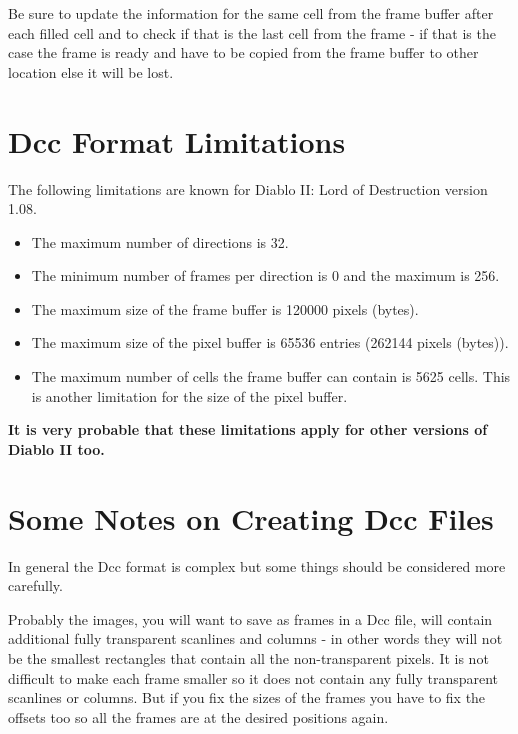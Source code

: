 
Be sure to update the information for the same cell from the frame buffer after each filled cell and to check if that is the last cell from the frame - if that is the case the frame is ready and have to be copied from the frame buffer to other location else it will be lost.


\section{Dcc Format Limitations}
The following limitations are known for Diablo II: Lord of Destruction version 1.08.

\begin{itemize}
\item The maximum number of directions is 32.
\item The minimum number of frames per direction is 0 and the maximum is 256.
\item The maximum size of the frame buffer is 120000 pixels (bytes).
\item The maximum size of the pixel buffer is 65536 entries (262144 pixels (bytes)).
\item The maximum number of cells the frame buffer can contain is 5625 cells. This is another limitation for the size of the pixel buffer.
\end{itemize}

\textbf{It is very probable that these limitations apply for other versions 
of Diablo II too.}


\section{Some Notes on Creating Dcc Files}
In general the Dcc format is complex but some things should be considered more carefully.

Probably the images, you will want to save as frames in a Dcc file, will contain additional fully transparent scanlines and columns - in other words they will not be the smallest rectangles that contain all the non-transparent pixels. It is not difficult to make each frame smaller so it does not contain any fully transparent scanlines or columns. But if you fix the sizes of the frames you have to fix the offsets too so all the frames are at the desired positions again.

